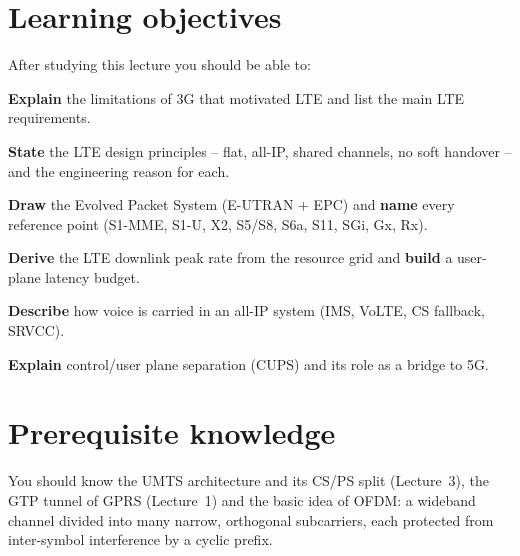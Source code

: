 \documentclass[11pt,a4paper]{article}
\begin{document}
\ACNcover

\section{Learning objectives}
After studying this lecture you should be able to:
\begin{objectives}
  \item \textbf{Explain} the limitations of 3G that motivated LTE and list the main LTE
        requirements.
  \item \textbf{State} the LTE design principles -- flat, all-IP, shared channels, no soft
        handover -- and the engineering reason for each.
  \item \textbf{Draw} the Evolved Packet System (E-UTRAN + EPC) and \textbf{name} every
        reference point (S1-MME, S1-U, X2, S5/S8, S6a, S11, SGi, Gx, Rx).
  \item \textbf{Derive} the LTE downlink peak rate from the resource grid and
        \textbf{build} a user-plane latency budget.
  \item \textbf{Describe} how voice is carried in an all-IP system (IMS, VoLTE, CS fallback,
        SRVCC).
  \item \textbf{Explain} control/user plane separation (CUPS) and its role as a bridge to 5G.
\end{objectives}

\section{Prerequisite knowledge}
You should know the UMTS architecture and its CS/PS split (Lecture~3), the GTP tunnel of
GPRS (Lecture~1) and the basic idea of OFDM: a wideband channel divided into many narrow,
orthogonal subcarriers, each protected from inter-symbol interference by a cyclic prefix.
\end{document}
